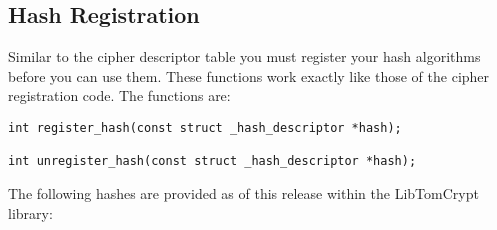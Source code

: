 \documentclass[synpaper]{book}
\begin{document}
\subsection{Hash Registration}
Similar to the cipher descriptor table you must register your hash algorithms before you can use them.  These functions
work exactly like those of the cipher registration code.  The functions are:
 
\begin{verbatim}
int register_hash(const struct _hash_descriptor *hash);

int unregister_hash(const struct _hash_descriptor *hash);
\end{verbatim}

The following hashes are provided as of this release within the LibTomCrypt library:
\end{document}
